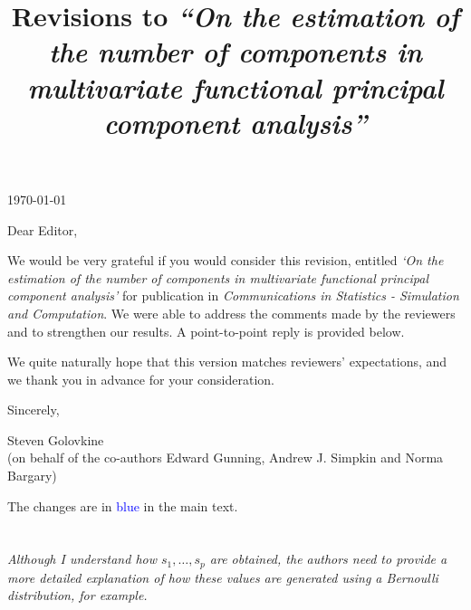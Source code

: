 \documentclass[12pt,a4paper]{article}
\title{\vspace{-1cm}
\begin{flushleft} {\sffamily Revisions to \emph{``On the estimation of the number of components in multivariate functional principal component analysis''}}\end{flushleft}}
\date{\vspace{-1.7cm}\begin{flushleft}\sffamily Steven Golovkine,
Edward Gunning,
Andrew J. Simpkin,
and 
Norma Bargary.
\end{flushleft}}
\newcommand{\comments}[1]{\subsection{}
\begin{mdframed}[style=comments] 
        \textit{#1}
\end{mdframed}}
\begin{document}
\qquad

\qquad

\qquad


\qquad

\qquad

\qquad

\newcommand{\thedate}{\today}

\thedate

\qquad

\qquad

\qquad



Dear Editor,

\qquad


We would be very grateful if you would consider this revision, entitled \emph{`On the estimation of the number of components in multivariate functional principal component analysis'} for publication in \emph{Communications in Statistics - Simulation and Computation}. We were able to address the comments made by the reviewers and to strengthen our results. A point-to-point reply is provided below. 

\quad

We quite naturally hope that this version matches reviewers' expectations, and we thank you in advance for your consideration.



\quad


Sincerely, 

\medskip



 Steven Golovkine 
 \\(on behalf of the co-authors  Edward Gunning, Andrew J. Simpkin and Norma Bargary)





\newpage

\maketitle

\noindent The changes are in \textcolor{blue}{blue} in the main text.
\vspace*{1cm}

\section{}

\comments{Although I understand how $s_1, \dots , s_p$ are obtained, the authors need to provide a more detailed explanation of how these values are generated using a Bernoulli distribution, for example.}
\end{document}
